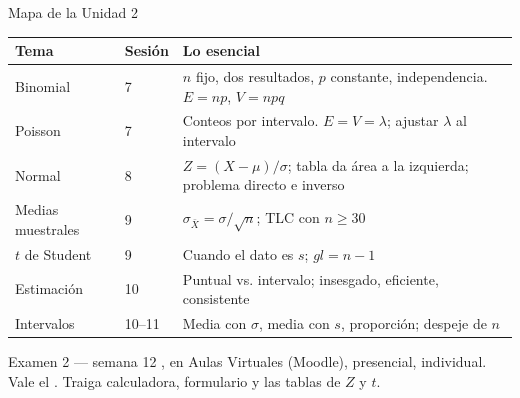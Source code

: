 \documentclass[aspectratio=169,10pt]{beamer}
\begin{document}

\begin{frame}{Mapa de la Unidad 2}
  \scriptsize
  \begin{center}
  \begin{tabular}{@{}llp{6.4cm}@{}}
    \toprule
    \textbf{Tema} & \textbf{Sesión} & \textbf{Lo esencial} \\
    \midrule
    Binomial & 7 & $n$ fijo, dos resultados, $p$ constante, independencia.
      $E=np$, $V=npq$ \\
    Poisson & 7 & Conteos por intervalo. $E=V=\lambda$; ajustar $\lambda$ al
      intervalo \\
    Normal & 8 & $Z=(X-\mu)/\sigma$; tabla da área a la izquierda; problema
      directo e inverso \\
    Medias muestrales & 9 & $\sigma_{\bar X}=\sigma/\sqrt{n}$; TLC con
      $n\ge 30$ \\
    $t$ de Student & 9 & Cuando el dato es $s$; $gl=n-1$ \\
    Estimación & 10 & Puntual vs. intervalo; insesgado, eficiente, consistente \\
    Intervalos & 10--11 & Media con $\sigma$, media con $s$, proporción;
      despeje de $n$ \\
    \bottomrule
  \end{tabular}
  \end{center}

  \vspace{0.15cm}
  \begin{alertblock}{Examen 2 — semana 12}
    \footnotesize
    , en Aulas Virtuales (Moodle), presencial,
    individual. Vale el . Traiga calculadora, formulario y
    las tablas de $Z$ y $t$.
  \end{alertblock}
\end{frame}
\end{document}
